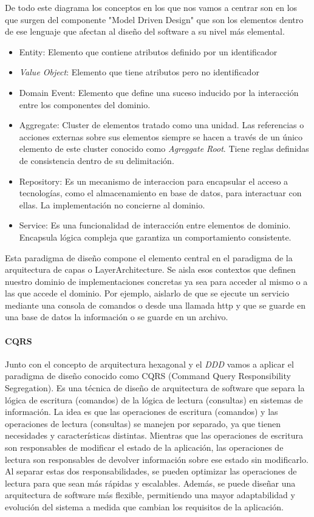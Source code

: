 De todo este diagrama los conceptos en los que nos vamos a centrar son en los que surgen del componente "Model Driven Design" que son los elementos dentro de ese lenguaje que afectan al diseño del software a su nivel más elemental.

\begin{itemize}
    \item Entity: Elemento que contiene atributos definido por un identificador
    \item \textit{Value Object}: Elemento que tiene atributos pero no identificador
    \item Domain Event: Elemento que define una suceso inducido por la interacción entre los componentes del dominio.
    \item Aggregate: Cluster de elementos tratado como una unidad. Las referencias o acciones externas sobre sus elementos siempre se hacen a través de un único elemento de este cluster conocido como \textit{Agreggate Root}. Tiene reglas definidas de consistencia dentro de su delimitación.
    \item Repository: Es un mecanismo de interaccion para encapsular el acceso a tecnologías, como el almacenamiento en base de datos, para interactuar con ellas. La implementación no concierne al dominio.
    \item Service: Es una funcionalidad de interacción entre elementos de dominio. Encapsula lógica compleja que garantiza un comportamiento consistente.
\end{itemize}

Esta paradigma de diseño compone el elemento central en el paradigma de la arquitectura de capas o \gls{LayerArchitecture}. Se aisla esos contextos que definen nuestro dominio de implementaciones concretas ya sea para acceder al mismo o a las que accede el dominio. Por ejemplo, aislarlo de que se ejecute un servicio mediante una consola de comandos o desde una llamada http y que se guarde en una base de datos la información o se guarde en un archivo.

\paragraph{CQRS}

Junto con el concepto de arquitectura hexagonal y el \textit{DDD} vamos a aplicar el paradigma de diseño conocido como \gls{CQRS} (Command Query Responsibility Segregation).
Es una técnica de diseño de arquitectura de software que separa la lógica de escritura (comandos) de la lógica de lectura (consultas) en sistemas de información.
La idea es que las operaciones de escritura (comandos) y las operaciones de lectura (consultas) se manejen por separado, ya que tienen necesidades y características distintas.
Mientras que las operaciones de escritura son responsables de modificar el estado de la aplicación, las operaciones de lectura son responsables de devolver información sobre ese estado sin modificarlo.
Al separar estas dos responsabilidades, se pueden optimizar las operaciones de lectura para que sean más rápidas y escalables.
Además, se puede diseñar una arquitectura de software más flexible, permitiendo una mayor adaptabilidad y evolución del sistema a medida que cambian los requisitos de la aplicación.

